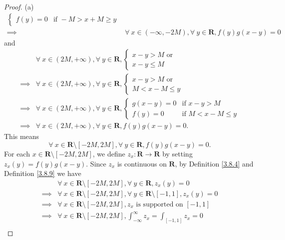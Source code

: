 \begin{proof}{(a)}
\begin{align*}
\begin{cases}
            f(y) = 0     & \text{if } -M > x + M \geq y
        \end{cases} \\
        \implies & \forall\ x \in (-\infty, -2M), \forall\ y \in \mathbf{R}, f(y) g(x - y) = 0
    \end{align*}
    and
    \begin{align*}
                 & \forall\ x \in (2M, +\infty), \forall\ y \in \mathbf{R}, \begin{cases}
            x - y > M \text{ or } \\
            x - y \leq M
        \end{cases} \\
        \implies & \forall\ x \in (2M, +\infty), \forall\ y \in \mathbf{R}, \begin{cases}
            x - y > M \text{ or } \\
            M < x - M \leq y
        \end{cases} \\
        \implies & \forall\ x \in (2M, +\infty), \forall\ y \in \mathbf{R}, \begin{cases}
            g(x - y) = 0 & \text{if } x - y > M        \\
            f(y) = 0     & \text{if } M < x - M \leq y
        \end{cases} \\
        \implies & \forall\ x \in (2M, +\infty), \forall\ y \in \mathbf{R}, f(y) g(x - y) = 0.
    \end{align*}
    This means
    \[
        \forall\ x \in \mathbf{R} \setminus [-2M, 2M], \forall\ y \in \mathbf{R}, f(y) g(x - y) = 0.
    \]
    For each \(x \in \mathbf{R} \setminus [-2M, 2M]\), we define \(z_x : \mathbf{R} \to \mathbf{R}\) by setting \(z_x(y) = f(y) g(x - y)\).
    Since \(z_x\) is continuous on \(\mathbf{R}\), by Definition \ref{3.8.4} and Definition \ref{3.8.9} we have
    \begin{align*}
                 & \forall\ x \in \mathbf{R} \setminus [-2M, 2M], \forall\ y \in \mathbf{R}, z_x(y) = 0                                \\
        \implies & \forall\ x \in \mathbf{R} \setminus [-2M, 2M], \forall\ y \in \mathbf{R} \setminus [-1, 1], z_x(y) = 0              \\
        \implies & \forall\ x \in \mathbf{R} \setminus [-2M, 2M], z_x \text{ is supported on } [-1, 1]                                 \\
        \implies & \forall\ x \in \mathbf{R} \setminus [-2M, 2M], \int_{-\infty}^\infty z_x = \int_{[-1, 1]} z_x = 0                   \\

\end{align*}
\end{proof}
